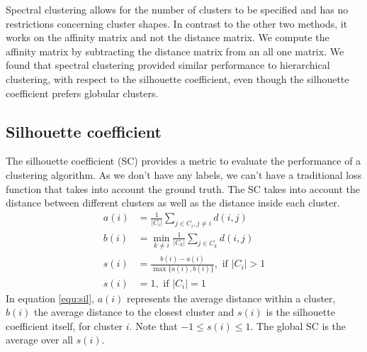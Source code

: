 \documentclass[conference]{IEEEtran}
\begin{document}
Spectral clustering allows for the number of clusters to be specified and has no restrictions concerning cluster shapes. In contrast to the other two methods, it works on the affinity matrix and not the distance matrix. We compute the affinity matrix by subtracting the distance matrix from an all one matrix. We found that spectral clustering provided similar performance to hierarchical clustering, with respect to the silhouette coefficient, even though the silhouette coefficient prefers globular clusters.

\subsection*{Silhouette coefficient}
The silhouette coefficient (SC) provides a metric to evaluate the performance of a clustering algorithm. As we don't have any labels, we can't have a traditional loss function that takes into account the ground truth. The SC takes into account the distance between different clusters as well as the distance inside each cluster.
\begin{equation}\label{equ:sil}
        \begin{split}
            a(i) & = \frac{1}{\lvert C_i \rvert} \sum_{j \in C_i, j \neq i} d(i, j) \\
            b(i) & = \min_{k \neq i}\frac{1}{\lvert C_k \rvert}\sum_{j \in C_k}d(i,j)\\
            s(i) & = \frac{b(i) - a(i)}{\max\{a(i), b(i)\}}, \textrm{ if } \lvert C_i \rvert > 1\\
            s(i) & = 1, \textrm{ if } \lvert C_i \rvert = 1
        \end{split}
\end{equation}
In equation \ref{equ:sil}, $a(i)$ represents the average distance within a cluster, $b(i)$ the average distance to the closest cluster and $s(i)$ is the silhouette coefficient itself, for cluster $i$. Note that $-1 \leq s(i) \leq 1$. The global SC is the average over all $s(i)$. 
\end{document}
